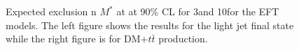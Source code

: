 \begin{figure}[h!]
  \centering
  \caption{\label{fig:limits_EFT} Expected exclusion n $M^*$ at at 90\% CL for 3\fbinv and 10\fbinv for the EFT models. The left figure shows the results for the light jet final state while the right figure is for DM+$t\bar{t}$ production. }
\end{figure}




